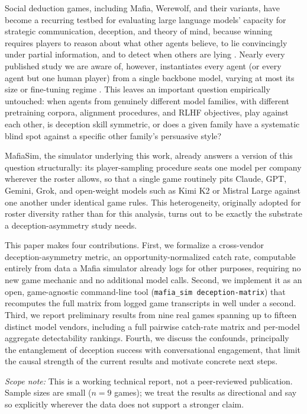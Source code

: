 \documentclass[10pt,conference]{IEEEtran}
\begin{document}
Social deduction games, including Mafia, Werewolf, and their variants, have become a recurring testbed for evaluating large language models' capacity for strategic communication, deception, and theory of mind, because winning requires players to reason about what other agents believe, to lie convincingly under partial information, and to detect when others are lying \cite{eckhaus2025time,feng2024survey,song2025beyond}. Nearly every published study we are aware of, however, instantiates every agent (or every agent but one human player) from a single backbone model, varying at most its size or fine-tuning regime \cite{eckhaus2025time,zhang2025dvm,mittal2026triadic}. This leaves an important question empirically untouched: when agents from genuinely different model families, with different pretraining corpora, alignment procedures, and RLHF objectives, play against each other, is deception skill symmetric, or does a given family have a systematic blind spot against a specific other family's persuasive style?

MafiaSim, the simulator underlying this work, already answers a version of this question structurally: its player-sampling procedure seats one model per company wherever the roster allows, so that a single game routinely pits Claude, GPT, Gemini, Grok, and open-weight models such as Kimi K2 or Mistral Large against one another under identical game rules. This heterogeneity, originally adopted for roster diversity rather than for this analysis, turns out to be exactly the substrate a deception-asymmetry study needs.

This paper makes four contributions. First, we formalize a cross-vendor deception-asymmetry metric, an opportunity-normalized catch rate, computable entirely from data a Mafia simulator already logs for other purposes, requiring no new game mechanic and no additional model calls. Second, we implement it as an open, game-agnostic command-line tool (\texttt{mafia\_sim deception-matrix}) that recomputes the full matrix from logged game transcripts in well under a second. Third, we report preliminary results from nine real games spanning up to fifteen distinct model vendors, including a full pairwise catch-rate matrix and per-model aggregate detectability rankings. Fourth, we discuss the confounds, principally the entanglement of deception success with conversational engagement, that limit the causal strength of the current results and motivate concrete next steps.

\textit{Scope note:} This is a working technical report, not a peer-reviewed publication. Sample sizes are small ($n=9$ games); we treat the results as directional and say so explicitly wherever the data does not support a stronger claim.
\end{document}
